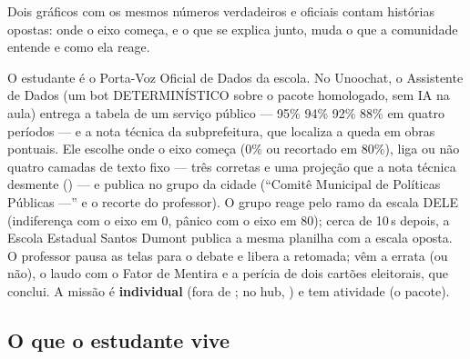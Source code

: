 \begin{destaque}
Dois gráficos com os mesmos números verdadeiros e oficiais contam histórias
opostas: onde o eixo começa, e o que se explica junto, muda o que a
comunidade entende e como ela reage.
\end{destaque}

O estudante é o Porta-Voz Oficial de Dados da escola. No Unoochat, o
Assistente de Dados (um bot DETERMINÍSTICO sobre o pacote homologado, sem IA
na aula) entrega a tabela de um serviço público --- 95\% \seta{} 94\% \seta{}
92\% \seta{} 88\% em quatro períodos --- e a nota técnica da subprefeitura,
que localiza a queda em obras pontuais. Ele escolhe onde o eixo começa (0\%
ou recortado em 80\%), liga ou não quatro camadas de texto fixo --- três
corretas e uma projeção que a nota técnica desmente () --- e publica no
grupo da cidade (\enquote{Comitê Municipal de Políticas Públicas ---} e o
recorte do professor). O grupo reage pelo ramo da escala DELE (indiferença com
o eixo em 0, pânico com o eixo em 80); cerca de 10\,s depois, a Escola
Estadual Santos Dumont publica a mesma planilha com a escala oposta. O
professor pausa as telas para o debate e libera a retomada; vêm a errata (ou
não), o laudo com o Fator de Mentira e a perícia de dois cartões eleitorais,
que conclui. A missão é \textbf{individual} (fora de
; no hub, ) e tem
atividade (o pacote).

\subsection{O que o estudante vive}

